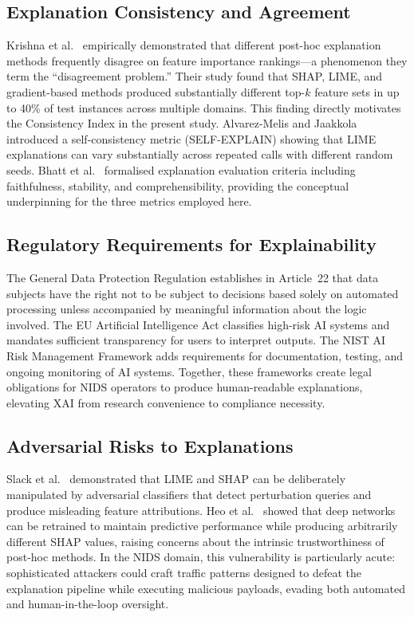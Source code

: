 \documentclass[conference]{IEEEtran}
\begin{document}
\subsection{Explanation Consistency and Agreement}

Krishna et al.\ \cite{krishna2022} empirically demonstrated that different post-hoc explanation methods frequently disagree on feature importance rankings---a phenomenon they term the ``disagreement problem.'' Their study found that SHAP, LIME, and gradient-based methods produced substantially different top-$k$ feature sets in up to 40\% of test instances across multiple domains. This finding directly motivates the Consistency Index in the present study. Alvarez-Melis and Jaakkola \cite{alvarezmelis2018} introduced a self-consistency metric (SELF-EXPLAIN) showing that LIME explanations can vary substantially across repeated calls with different random seeds. Bhatt et al.\ \cite{bhatt2020} formalised explanation evaluation criteria including faithfulness, stability, and comprehensibility, providing the conceptual underpinning for the three metrics employed here.

\subsection{Regulatory Requirements for Explainability}

The General Data Protection Regulation \cite{gdpr2016} establishes in Article~22 that data subjects have the right not to be subject to decisions based solely on automated processing unless accompanied by meaningful information about the logic involved. The EU Artificial Intelligence Act \cite{euaiact2024} classifies high-risk AI systems and mandates sufficient transparency for users to interpret outputs. The NIST AI Risk Management Framework \cite{nistairf2023} adds requirements for documentation, testing, and ongoing monitoring of AI systems. Together, these frameworks create legal obligations for NIDS operators to produce human-readable explanations, elevating XAI from research convenience to compliance necessity.

\subsection{Adversarial Risks to Explanations}

Slack et al.\ \cite{slack2020} demonstrated that LIME and SHAP can be deliberately manipulated by adversarial classifiers that detect perturbation queries and produce misleading feature attributions. Heo et al.\ \cite{heo2019} showed that deep networks can be retrained to maintain predictive performance while producing arbitrarily different SHAP values, raising concerns about the intrinsic trustworthiness of post-hoc methods. In the NIDS domain, this vulnerability is particularly acute: sophisticated attackers could craft traffic patterns designed to defeat the explanation pipeline while executing malicious payloads, evading both automated and human-in-the-loop oversight.
\end{document}
